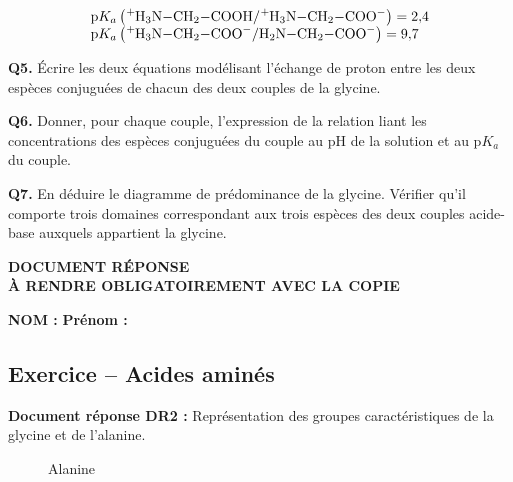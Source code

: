 \[
\begin{array}{l}
\mathrm{p}K_a \left(\ce{^+H3N-CH2-COOH} / \ce{^+H3N-CH2-COO-}\right) = 2{,}4 \\
\mathrm{p}K_a \left(\ce{^+H3N-CH2-COO-} / \ce{H2N-CH2-COO-}\right) = 9{,}7 \\
\end{array}
\]

\medskip
\noindent
\textbf{Q5.} Écrire les deux équations modélisant l’échange de proton entre les deux espèces conjuguées de chacun des deux couples de la glycine.

\medskip
\noindent
\textbf{Q6.} Donner, pour chaque couple, l’expression de la relation liant les concentrations des espèces conjuguées du couple au $\mathrm{pH}$ de la solution et au $\mathrm{p}K_a$ du couple.

\medskip
\noindent
\textbf{Q7.} En déduire le diagramme de prédominance de la glycine. Vérifier qu’il comporte trois domaines correspondant aux trois espèces des deux couples acide-base auxquels appartient la glycine.

\AMCcleardoublepage
\begin{center}
\textbf{DOCUMENT RÉPONSE \\
À RENDRE OBLIGATOIREMENT AVEC LA COPIE}
\end{center}

\textbf{NOM :} \dotfill \textbf{Prénom :} \dotfill

\subsection*{Exercice – Acides aminés}

\medskip

\textbf{Document réponse DR2 :} Représentation des groupes caractéristiques de la glycine et de l’alanine.
\begin{figure}[ht]
    \centering
    \begin{minipage}[t]{0.45\textwidth}
        \centering
        \caption{Glycine}
    \end{minipage}%
    \hspace{0.05\textwidth}%
    \begin{minipage}[t]{0.45\textwidth}
        \centering
        \caption{Alanine}
    \end{minipage}
\end{figure}
\AMCcleardoublepage
